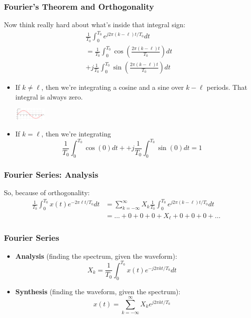 \documentclass{beamer}
\begin{document}
\begin{frame}
  \frametitle{Fourier's Theorem and Orthogonality}

  Now think really hard about what's inside that integral sign:
  \begin{align*}
    &\frac{1}{T_0}\int_0^{T_0} e^{j2\pi (k-\ell)t/T_0}dt\\
    &=\frac{1}{T_0}\int_0^{T_0}\cos\left(\frac{2\pi(k-\ell)t}{T_0}\right)dt\\
    &+j\frac{1}{T_0}\int_0^{T_0}\sin\left(\frac{2\pi (k-\ell)t}{T_0}\right)dt
  \end{align*}
  \begin{itemize}
  \item If $k\ne\ell$, then we're integrating a cosine and a sine over
    $k-\ell$ periods.  That integral is always zero.
    \centerline{\includegraphics[height=0.25in]{Sine_one_period.png}}
  \item If $k=\ell$, then we're integrating
    \[
    \frac{1}{T_0}\int_0^{T_0}\cos(0)dt+
    +j\frac{1}{T_0}\int_0^{T_0}\sin(0)dt = 1
    \]
  \end{itemize}
\end{frame}

\begin{frame}
  \frametitle{Fourier Series: Analysis}

  So, because of orthogonality:
  \begin{align*}
  \frac{1}{T_0}\int_0^{T_0}x(t)e^{-2\pi\ell t/T_0}dt &=
  \sum_{k=-\infty}^\infty X_k \frac{1}{T_0}\int_0^{T_0} e^{j2\pi (k-\ell)t/T_0}dt\\
  &= \ldots + 0 + 0 + 0 + X_\ell + 0 +0 + 0 + \ldots
  \end{align*}
  
\end{frame}  

\begin{frame}
  \frametitle{Fourier Series}

  \begin{itemize}
  \item {\bf Analysis}  (finding the spectrum, given the waveform):
    \[
    X_k = \frac{1}{T_0}\int_0^{T_0} x(t)e^{-j2\pi kt/T_0}dt
    \]
  \item {\bf Synthesis} (finding the waveform, given the spectrum):
    \[
    x(t) = \sum_{k=-\infty}^\infty X_k e^{j2\pi kt/T_0}
    \]
  \end{itemize}
  
\end{frame}  
\end{document}
